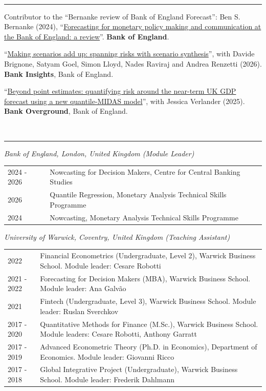 \documentclass[11pt,a4paper]{article}
\makeatletter
\newcommand{\cvsection}[1]{\vspace{10pt}{\small\bfseries #1}\\[-7pt]\rule{\linewidth}{0.6pt}\vspace{2pt}}
\newenvironment{cvtable}{\small\begin{longtable}{@{}p{3.3cm}p{\dimexpr\linewidth-3.3cm-2\tabcolsep\relax}@{}}}{\end{longtable}\vspace{-14pt}}
\makeatother
\begin{document}
\cvsection{Policy Publications}
\begin{pubs}[resume]\small
\item Contributor to the ``Bernanke review of Bank of England Forecast'': Ben S. Bernanke (2024), ``\href{https://www.bankofengland.co.uk/independent-evaluation-office/forecasting-for-monetary-policy-making-and-communication-at-the-bank-of-england-a-review/forecasting-for-monetary-policy-making-and-communication-at-the-bank-of-england-a-review}{Forecasting for monetary policy making and communication at the Bank of England: a review}''. \textbf{Bank of England}.
\item ``\href{https://www.bankofengland.co.uk/bank-insights/2026/making-scenarios-add-up-spanning-risks-with-scenario-synthesis}{Making scenarios add up: spanning risks with scenario synthesis}'', with Davide Brignone, Satyam Goel, Simon Lloyd, Nades Raviraj and Andrea Renzetti (2026). \textbf{Bank Insights}, Bank of England.
\item ``\href{https://www.bankofengland.co.uk/bank-overground/2025/beyond-point-estimates-quantifying-risk-around-the-near-term-uk-gdp-forecast}{Beyond point estimates: quantifying risk around the near-term UK GDP forecast using a new quantile-MIDAS model}'', with Jessica Verlander (2025). \textbf{Bank Overground}, Bank of England.
\end{pubs}

\cvsection{Teaching Experience}
{\small\textit{Bank of England, London, United Kingdom (Module Leader)}}\vspace{2pt}
\begin{cvtable}
2024 - 2026 & Nowcasting for Decision Makers, Centre for Central Banking Studies \\
2026 & Quantile Regression, Monetary Analysis Technical Skills Programme \\
2024 & Nowcasting, Monetary Analysis Technical Skills Programme \\
\end{cvtable}

\vspace{8pt}
{\small\textit{University of Warwick, Coventry, United Kingdom (Teaching Assistant)}}\vspace{2pt}
\begin{cvtable}
2022 & Financial Econometrics (Undergraduate, Level 2), Warwick Business School. Module leader: Cesare Robotti \\
2021 - 2022 & Forecasting for Decision Makers (MBA), Warwick Business School. Module leader: Ana Galv\~ao \\
2021 & Fintech (Undergraduate, Level 3), Warwick Business School. Module leader: Ruslan Sverchkov \\
2017 - 2020 & Quantitative Methods for Finance (M.Sc.), Warwick Business School. Module leaders: Cesare Robotti, Anthony Garratt \\
2017 - 2019 & Advanced Econometric Theory (Ph.D. in Economics), Department of Economics. Module leader: Giovanni Ricco \\
2017 - 2018 & Global Integrative Project (Undergraduate), Warwick Business School. Module leader: Frederik Dahlmann \\
\end{cvtable}
\end{document}
